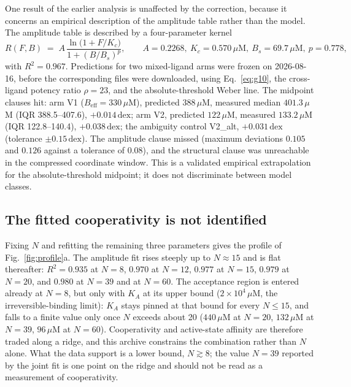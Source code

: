 ﻿\documentclass[11pt,a4paper]{article}
\newcommand{\dex}{\ensuremath{\,\mathrm{dex}}}
\begin{document}
One result of the earlier analysis is unaffected by the correction, because it concerns an empirical
description of the amplitude table rather than the model. The amplitude table is described by a
four-parameter kernel
\begin{equation}
R(F,B) \;=\; A\,\frac{\ln\!\big(1+F/K_c\big)}{1+(B/B_s)^{p}},
\qquad
A=0.2268,\ K_c=0.570\,\mu\mathrm{M},\ B_s=69.7\,\mu\mathrm{M},\ p=0.778,
\label{eq:g10}
\end{equation}
with $R^2=0.967$. Predictions for two mixed-ligand arms were frozen on 2026-08-16, before the
corresponding files were downloaded, using Eq.~\eqref{eq:g10}, the cross-ligand potency ratio
$\rho=23$, and the absolute-threshold Weber line. The midpoint clauses hit: arm V1
($B_{\mathrm{eff}}=330\,\mu$M), predicted $388\,\mu$M, measured median $401.3\,\mu$M
(IQR 388.5--407.6), $+0.014\dex$; arm V2, predicted $122\,\mu$M, measured $133.2\,\mu$M
(IQR 122.8--140.4), $+0.038\dex$; the ambiguity control V2\_alt, $+0.031\dex$ (tolerance
$\pm0.15\dex$). The amplitude clause missed (maximum deviations $0.105$ and $0.126$ against a
tolerance of $0.08$), and the structural clause was unreachable in the compressed coordinate window.
This is a validated empirical extrapolation for the absolute-threshold midpoint; it does not
discriminate between model classes.

\subsection{The fitted cooperativity is not identified}
\label{sec:profile}

Fixing $N$ and refitting the remaining three parameters gives the profile of Fig.~\ref{fig:profile}a.
The amplitude fit rises steeply up to $N\approx15$ and is flat thereafter: $R^2=0.935$ at $N=8$,
$0.970$ at $N=12$, $0.977$ at $N=15$, $0.979$ at $N=20$, and $0.980$ at $N=39$ and at $N=60$. The
acceptance region is entered already at $N=8$, but only with $K_A$ at its upper bound
($2\times10^{4}\,\mu$M, the irreversible-binding limit): $K_A$ stays pinned at that bound for every
$N\le15$, and falls to a finite value only once $N$ exceeds about 20 ($440\,\mu$M at $N=20$,
$132\,\mu$M at $N=39$, $96\,\mu$M at $N=60$). Cooperativity and active-state affinity are therefore
traded along a ridge, and this archive constrains the combination rather than $N$ alone. What the
data support is a lower bound, $N\gtrsim8$; the value $N=39$ reported by the joint fit is one point
on the ridge and should not be read as a measurement of cooperativity.
\end{document}

